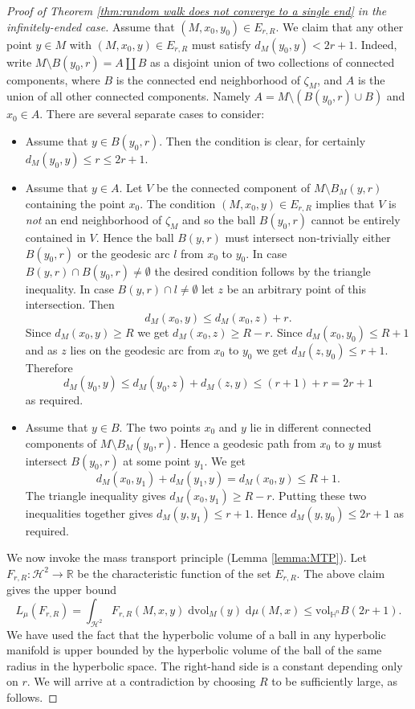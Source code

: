 \documentclass{amsart}
\newcommand{\HH}{\mathbb{H}}
\newcommand{\Hypers}{\mathcal{H}}
\theoremstyle{plain}
\numberwithin{equation}{section}
\theoremstyle{definition}
\begin{document}
\begin{proof}[Proof of Theorem \ref{thm:random walk does not converge to a single end} in the infinitely-ended case]
Assume that $(M,x_0,y_0) \in E_{r,R}$. We claim that any other point $y \in M$ with $(M,x_0,y) \in E_{r,R}$ must satisfy $d_M(y_0,y) < 2r+1$. Indeed, write $M \setminus B(y_0,r) = A \amalg B$ as a disjoint union of two collections of connected components, where $B$ is the connected end neighborhood of $\zeta_M$, and $A$ is the union of all other connected components. Namely  $A = M \setminus (B(y_0,r) \cup B)$ and $x_0 \in A$. There are several separate cases to consider:
\begin{itemize}
    \item Assume that $y \in B(y_0,r)$. Then the condition is clear, for certainly $d_M(y_0,y) \le r \le 2r+1$.
        \item Assume that $y \in A$. Let $V$ be the connected component of $M \setminus B_M(y,r)$ containing the point $x_0$. The condition $(M,x_0,y) \in E_{r,R}$ implies that $V$ is \emph{not} an end neighborhood of $\zeta_M$ and so the ball $B(y_0,r)$ cannot be entirely contained in $V$. Hence the ball $B(y,r)$ must intersect non-trivially either $B(y_0,r)$ or the geodesic arc $l$ from $x_0$ to $y_0$. In case $B(y,r) \cap B(y_0,r) \neq \emptyset$ the desired condition follows by the triangle inequality. In case $B(y,r) \cap l \neq \emptyset$ let $z$ be an arbitrary point of this intersection. Then $$d_M(x_0,y) \le d_M(x_0,z) + r.$$ 
    Since $d_M(x_0,y) \ge R$  we get $d_M(x_0,z) \ge R-r$. Since $d_M(x_0,y_0) \le R+1$ and as  $z$ lies on the geodesic arc from $x_0$ to $y_0$ we get $d_M(z,y_0) \le r+1$.  Therefore
    $$d_M(y_0,y) \le d_M(y_0,z) + d_M(z,y) \le (r+1)+r = 2r + 1$$
    as required.

    \item Assume that $y \in B$. The two points $x_0$ and $y$ lie in different connected components of $M \setminus B_M(y_0,r)$. Hence a geodesic path from $x_0$ to $y$ must intersect $B(y_0,r)$ at some point $y_1$.  We get
    $$ d_M(x_0,y_1) + d_M(y_1,y) = d_M(x_0,y) \le   R+ 1.$$ 
    The triangle inequality gives $d_M(x_0,y_1) \ge R-r$. Putting these two inequalities together gives $d_M(y,y_1) \le r+1$. Hence $d_M(y,y_0) \le 2r+1$ as required.

\end{itemize}

We now invoke the mass transport principle (Lemma \ref{lemma:MTP}). 
Let $F_{r,R} : \Hypers^2 \to \mathbb{R}$ be the characteristic function of the set $E_{r,R}$. 
The above claim gives the upper bound
$$ L_\mu (F_{r,R}) = \int_{\Hypers^2} F_{r,R}(M,x,y) \; \mathrm{dvol}_M(y) \; \mathrm{d}\mu(M,x) \le \mathrm{vol}_{\HH^n} B(2r+1).$$
We have used the fact that the hyperbolic volume of a ball in any hyperbolic manifold is upper bounded by the hyperbolic volume of the ball of the same radius in the hyperbolic space. The right-hand side is a constant depending only on $r$. 
We will arrive at a contradiction  by choosing $R$  to be sufficiently large, as follows. 


\end{proof}
\end{document}
